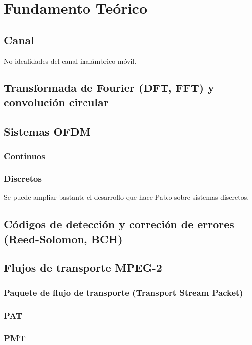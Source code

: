 \chapter{Fundamento Teórico}

\section{Canal}
No idealidades del canal inalámbrico móvil.

\section{Transformada de Fourier (DFT, FFT) y convolución circular}

\section{Sistemas OFDM}

\subsection{Continuos}

\subsection{Discretos}
Se puede ampliar bastante el desarrollo que hace Pablo sobre sistemas discretos. 

\section{Códigos de detección y correción de errores (Reed-Solomon, BCH)}


\section{Flujos de transporte MPEG-2}
\subsection{Paquete de flujo de transporte (Transport Stream Packet)}
\subsection{PAT}
\subsection{PMT}

